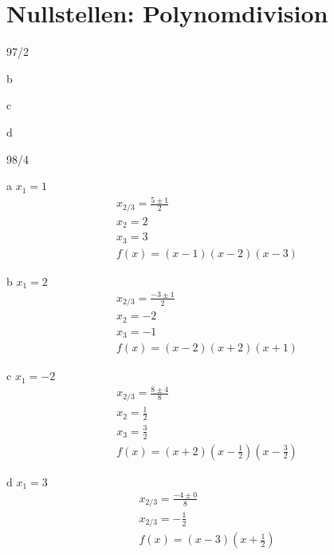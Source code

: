 \section{Nullstellen: Polynomdivision}
\begin{exercise}{97/2}
  \item [b]
  \item [c]
  \item [d]
\end{exercise}
\begin{exercise}{98/4}
  \item [a]
  $x_1 = 1$ \\
  \begin{gather*}
    x_{2/3} = \frac{5 \pm 1}{2} \\
    x_2 = 2 \\
    x_3 = 3 \\
    f(x) = (x - 1)(x - 2)(x - 3)
  \end{gather*}
  \newpage
  \item [b]
  $x_1 = 2$ \\
  \begin{gather*}
    x_{2/3} = \frac{-3 \pm 1}{2} \\
    x_2 = -2 \\
    x_3 = -1 \\
    f(x) = (x - 2)(x + 2)(x + 1)
  \end{gather*}
  \item [c]
  $x_1 = -2$ \\
  \begin{gather*}
    x_{2/3} = \frac{8 \pm 4}{8} \\
    x_2 = \frac{1}{2} \\
    x_3 = \frac{3}{2} \\
    f(x) = (x + 2)(x - \frac{1}{2})(x - \frac{3}{2})
  \end{gather*}
  \newpage
  \item [d]
  $x_1 = 3$ \\
  \begin{gather*}
    x_{2/3} = \frac{-4 \pm 0}{8} \\
    x_{2/3} = -\frac{1}{2} \\
    f(x) = (x - 3)(x + \frac{1}{2})
  \end{gather*}
\end{exercise}
